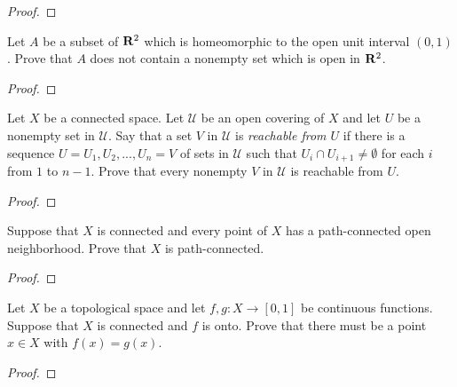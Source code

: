 \begin{proof}
\end{proof}
\begin{problem}
Let $A$ be a subset of $\mathbf{R}^2$ which is homeomorphic to the open
unit interval $(0,1)$. Prove that $A$ does not contain a nonempty
set which is open in $\mathbf{R}^2$.
\end{problem}
\begin{proof}
\end{proof}
\begin{problem}
Let $X$ be a connected space. Let $\mathcal{U}$ be an open
covering of $X$ and let $U$ be a nonempty set in
$\mathcal{U}$. Say that a set $V$ in $\mathcal{U}$ is
\emph{reachable from $U$} if there is a sequence
$U=U_1,U_2,...,U_n=V$ of sets in $\mathcal{U}$ such that $U_i\cap
U_{i+1}\neq\emptyset$ for each $i$ from $1$ to $n-1$. Prove that
every nonempty $V$ in $\mathcal{U}$ is reachable from $U$.
\end{problem}
\begin{proof}
\end{proof}
\begin{problem}
Suppose that $X$ is connected and every point of $X$ has a
path-connected open neighborhood. Prove that $X$ is
path-connected.
\end{problem}
\begin{proof}
\end{proof}
\begin{problem}
Let $X$ be a topological space and let $f,g\colon X\to[0,1]$ be
continuous functions. Suppose that $X$ is connected and $f$ is
onto. Prove that there must be a point $x\in X$ with
$f(x)=g(x)$.
\end{problem}
\begin{proof}
\end{proof}

